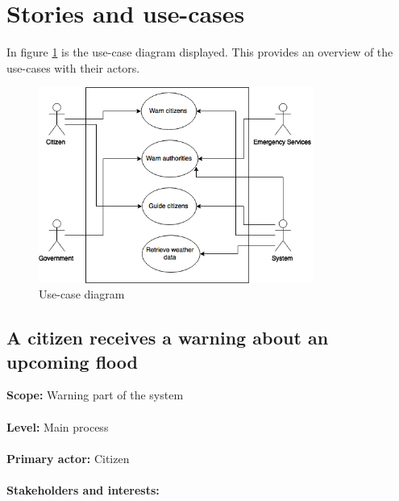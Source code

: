 \section{Stories and use-cases}
In figure \ref{fig:usecase-diagram} is the use-case diagram displayed. This provides an overview of the use-cases with their actors.

\begin{figure}[h]
\centering
\includegraphics[width=90mm]{images/usecaseDiagram.png}
\caption{Use-case diagram}
\label{fig:usecase-diagram}
\end{figure}

\subsection{A citizen receives a warning about an upcoming flood}
\textbf{Scope:} Warning part of the system\\\\
\textbf{Level:} Main process\\\\
\textbf{Primary actor:} Citizen\\\\
\textbf{Stakeholders and interests:}\\



